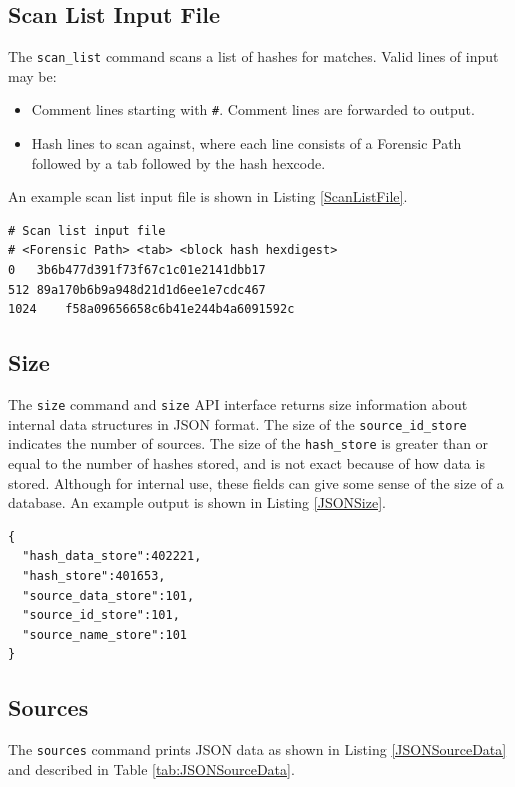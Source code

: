 \documentclass[11pt,fleqn]{article} %
\begin{document}
\subsection{Scan List Input File}
\label{ScanListInputFile}
The \verb+scan_list+ command scans a list of hashes for matches.  Valid lines of input may be:
\begin{itemize}
\item Comment lines starting with \verb+#+.  Comment lines are forwarded to output.
\item Hash lines to scan against, where each line consists of a Forensic Path followed by a tab followed by the hash hexcode.
\end{itemize}
An example scan list input file is shown in Listing \ref{ScanListFile}.\\

\lstset{style=customfile}
\begin{lstlisting}[float, caption={Example scan list input file}, label=ScanListFile]
# Scan list input file
# <Forensic Path> <tab> <block hash hexdigest>
0	3b6b477d391f73f67c1c01e2141dbb17
512	89a170b6b9a948d21d1d6ee1e7cdc467
1024	f58a09656658c6b41e244b4a6091592c
\end{lstlisting}

\subsection{Size}
The \hdb \verb+size+ command and \verb+size+ API interface returns size information about internal data structures in JSON format. The size of the \verb+source_id_store+ indicates the number of sources. The size of the \verb+hash_store+ is greater than or equal to the number of hashes stored, and is not exact because of how data is stored. Although for internal use, these fields can give some sense of the size of a \hdb database. An example output is shown in Listing \ref{JSONSize}.\\

\lstset{style=customfile}
\begin{lstlisting}[float, caption={Example JSON output of database size values}, label=JSONSize]
{
  "hash_data_store":402221,
  "hash_store":401653,
  "source_data_store":101,
  "source_id_store":101,
  "source_name_store":101
}
\end{lstlisting}

\subsection{Sources}
The \verb+sources+ command prints JSON data as shown in Listing \ref{JSONSourceData} and described in Table \ref{tab:JSONSourceData}.\\
\end{document}
